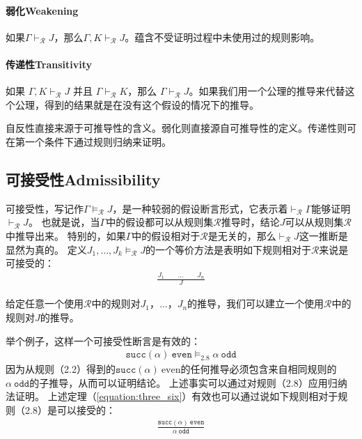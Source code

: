 \paragraph{弱化Weakening} 如果$\Gamma \vdash_{\mathcal{R}}J$，那么$\Gamma,K\vdash_{\mathcal{R}}J$。蕴含不受证明过程中未使用过的规则影响。
\paragraph{传递性Transitivity} 如果 $\Gamma,K\vdash_{\mathcal{R}}J$ 并且 $\Gamma \vdash_{\mathcal{R}} K$，那么 $\Gamma \vdash_{\mathcal{R}} J$。如果我们用一个公理的推导来代替这个公理，得到的结果就是在没有这个假设的情况下的推导。


自反性直接来源于可推导性的含义。弱化则直接源自可推导性的定义。传递性则可在第一个条件下通过规则归纳来证明。

\subsection{可接受性Admissibility}

可接受性，写记作$\Gamma \vDash_{\mathcal{R}} J$，是一种较弱的假设断言形式，它表示着$\vdash_{\mathcal{R}} \Gamma$能够证明$\vdash_{\mathcal{R}} J$。
也就是说，当$ \Gamma $中的假设都可以从规则集$ \mathcal {R} $推导时，结论$ J $可以从规则集$ \mathcal {R} $中推导出来。
特别的，如果$\Gamma$中的假设相对于$\mathcal{R}$是无关的，那么$\vdash_{\mathcal{R}} J$这一推断是显然为真的。
定义$J_1,\dots,J_k\vDash_\mathcal{R} J $的一个等价方法是表明如下规则相对于$\mathcal{R}$来说是可接受的：
\begin{equation}
    \begin{aligned}
        \frac{J_1 \qquad \dots \qquad J_n}{J}
    \end{aligned}
\end{equation}

给定任意一个使用$ \mathcal{R} $中的规则对$ J_1，\dots，J_n $的推导，我们可以建立一个使用$ \mathcal {R} $中的规则对$ J $的推导。

举个例子，这样一个可接受性断言是有效的：
\begin{equation}
    \begin{aligned}
        \mathtt{succ}(\alpha) \  \mathtt{even} \vDash_{2.8} \alpha \  \mathtt{odd} \label{equation:three_six}
    \end{aligned}
\end{equation}
因为从规则（2.2）得到的$ \mathtt{succ}(\alpha) \  \text{even} $的任何推导必须包含来自相同规则的$ \alpha \  \mathtt{odd} $的子推导，从而可以证明结论。
上述事实可以通过对规则（2.8）应用归纳法证明。
上述定理（\ref{equation:three_six}）有效也可以通过说如下规则相对于规则（2.8）是可以接受的：
\begin{equation}
    \begin{aligned}
        \frac{\mathtt{succ}(\alpha) \  \mathtt{even}}{\alpha \  \mathtt{odd}}
    \end{aligned}
\end{equation}

